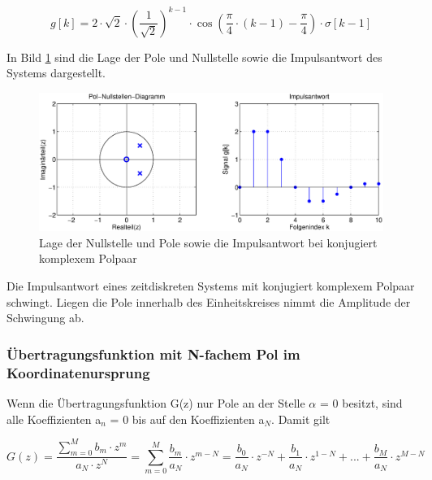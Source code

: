 \begin{equation}\label{eq:sixsonehundredsix}
g\left[k\right]=2\cdot \sqrt{2} \cdot \left(\frac{1}{\sqrt{2} } \right)^{k-1} \cdot \cos \left(\frac{\pi }{4} \cdot \left(k-1\right)-\frac{\pi }{4} \right)\cdot \sigma \left[k-1\right]
\end{equation}

\noindent In Bild \ref{fig:SystemKonjKomplexePole} sind die Lage der Pole und Nullstelle sowie die Impulsantwort des Systems dargestellt.

\begin{figure}[H]
  \centerline{\includegraphics[width=1\textwidth]{Kapitel6/Bilder/image12.eps}}
  \caption{Lage der Nullstelle und Pole sowie die Impulsantwort bei konjugiert komplexem Polpaar}
  \label{fig:SystemKonjKomplexePole}
\end{figure}

\noindent Die Impulsantwort eines zeitdiskreten Systems mit konjugiert komplexem Polpaar schwingt. Liegen die Pole innerhalb des Einheitskreises nimmt die Amplitude der Schwingung ab.

\clearpage

\subsubsection{\"{U}bertragungsfunktion mit N-fachem Pol im Koordinatenursprung}

\noindent Wenn die \"{U}bertragungsfunktion G(z) nur Pole an der Stelle $\alpha$ = 0 besitzt, sind alle Koeffizienten a${}_{n}$ = 0 bis auf den Koeffizienten a${}_{N}$. Damit gilt

\begin{equation}\label{eq:sixsonehundredseven}
G\left(z\right)=\frac{\sum _{m=0}^{M}b_{m} \cdot z^{m}  }{a_{N} \cdot z^{N} } =\sum _{m=0}^{M}\frac{b_{m} }{a_{N} } \cdot z^{m-N}  =\frac{b_{0} }{a_{N} } \cdot z^{-N} +\frac{b_{1} }{a_{N} } \cdot z^{1-N} +...+\frac{b_{M} }{a_{N} } \cdot z^{M-N}
\end{equation}

